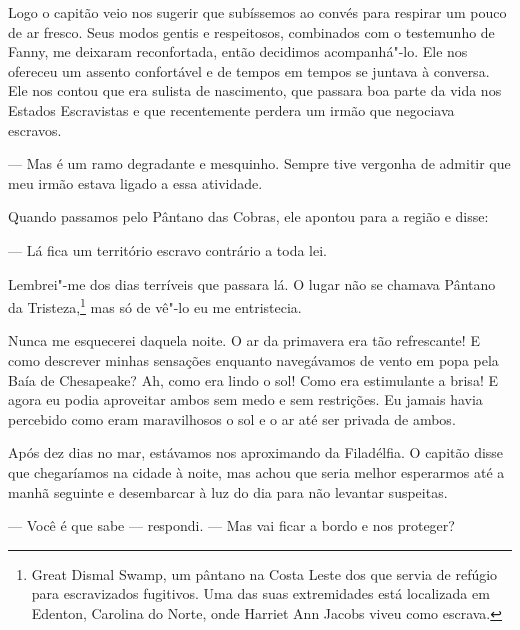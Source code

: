 Logo o capitão veio nos sugerir que
subíssemos ao convés para respirar um pouco de ar fresco. Seus modos
gentis e respeitosos, combinados com o testemunho de Fanny, me deixaram
reconfortada, então decidimos acompanhá"-lo. Ele nos ofereceu um assento
confortável e de tempos em tempos se juntava à conversa. Ele nos contou
que era sulista de nascimento, que passara boa parte da vida nos Estados
Escravistas e que recentemente perdera um irmão que negociava escravos.

--- Mas é um ramo degradante e mesquinho. Sempre tive vergonha de
admitir que meu irmão estava ligado a essa atividade.

Quando passamos pelo Pântano das Cobras, ele apontou para a região e
disse:

--- Lá fica um território escravo contrário a toda lei.

Lembrei"-me dos dias terríveis que passara lá. O lugar não se chamava
Pântano da Tristeza,\footnote{Great Dismal Swamp, um pântano na Costa
  Leste dos  que servia de refúgio para escravizados fugitivos. Uma das
  suas extremidades está localizada em Edenton, Carolina do Norte, onde
  Harriet Ann Jacobs viveu como escrava.} mas só de vê"-lo eu me
entristecia.

Nunca me esquecerei daquela noite. O ar
da primavera era tão refrescante! E como descrever minhas sensações
enquanto navegávamos de vento em popa pela Baía de Chesapeake? Ah, como
era lindo o sol! Como era estimulante a brisa! E agora eu podia
aproveitar ambos sem medo e sem restrições. Eu jamais havia percebido
como eram maravilhosos o sol e o ar até ser privada de ambos.

Após dez dias no mar, estávamos nos
aproximando da Filadélfia. O capitão disse que chegaríamos na cidade à
noite, mas achou que seria melhor esperarmos até a manhã seguinte e
desembarcar à luz do dia para não levantar suspeitas.

--- Você é que sabe --- respondi. ---
Mas vai ficar a bordo e nos proteger?

